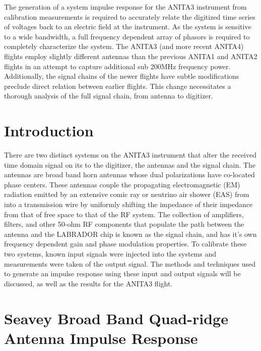 %
%
%
%


	The generation of a system impulse response for the ANITA3 instrument from calibration measurements is required to accurately relate the digitized time series of voltages back to an electric field at the instrument.  As the system is sensitive to a wide bandwidth, a full frequency dependent array of phasors is required to completely characterize the system.  The ANITA3 (and more recent ANITA4) flights employ slightly different antennas than the previous ANITA1 and ANITA2 flights in an attempt to capture additional sub 200MHz frequency power. Additionally, the signal chains of the newer flights have subtle modifications preclude direct relation between earlier flights.  This change necessitates a thorough analysis of the full signal chain, from antenna to digitizer.
	
\section{Introduction}

	There are two distinct systems on the ANITA3 instrument that alter the received time domain signal on its to the digitizer, the antennas and the signal chain.  The antennas are broad band horn antennas whose dual polarizations have co-located phase centers.  These antennas couple the propagating electromagnetic (EM) radiation emitted by an extensive comic ray or neutrino air shower (EAS) from into a transmission wire by uniformly shifting the impedance of their impedance from that of free space to that of the RF system.  The collection of amplifiers, filters, and other 50-ohm RF components that populate the path between the antenna and the LABRADOR chip is known as the signal chain, and has it's own frequency dependent gain and phase modulation properties.  To calibrate these two systems, known input signals were injected into the systems and measurements were taken of the output signal.  The methods and techniques used to generate an impulse response using these input and output signals will be discussed, as well as the results for the ANITA3 flight.


\section{Seavey Broad Band Quad-ridge Antenna Impulse Response}

